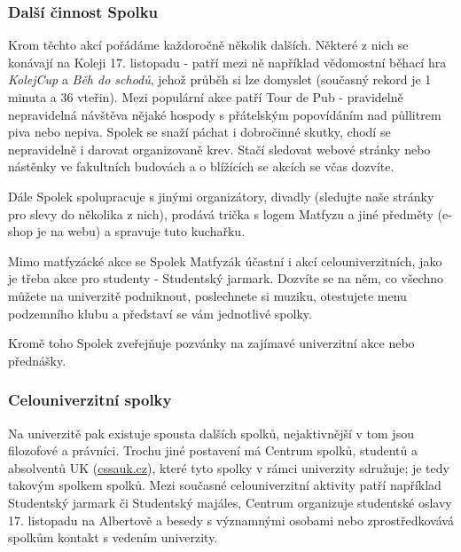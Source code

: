 \subsubsection{Další činnost Spolku}
Krom těchto akcí pořádáme každoročně několik dalších. Některé z nich se konávají
na Koleji 17. listopadu - patří mezi ně například vědomostní běhací hra
\textit{KolejCup} a \textit{Běh do schodů}, jehož průběh si lze domyslet
(současný rekord je 1 minuta a 36 vteřin). Mezi populární akce patří Tour de Pub
- pravidelně nepravidelná návštěva nějaké hospody s přátelským popovídáním nad
půllitrem piva nebo nepiva.
Spolek se snaží páchat i dobročinné skutky, chodí se nepravidelně i darovat organizovaně krev.
Stačí sledovat webové stránky nebo nástěnky ve
fakultních budovách a o blížících se akcích se včas dozvíte.

Dále Spolek spolupracuje s jinými organizátory, divadly (sledujte naše stránky
pro slevy do několika z nich), prodává trička s logem Matfyzu a jiné předměty
(e-shop je na webu) a spravuje tuto kuchařku.

Mimo matfyzácké akce se Spolek Matfyzák účastní i akcí celouniverzitních, jako
je třeba akce pro studenty - Studentský jarmark. Dozvíte se na něm, co všechno
můžete na univerzitě podniknout, poslechnete si muziku, otestujete menu
podzemního klubu a představí se vám jednotlivé spolky.

Kromě toho Spolek zveřejňuje pozvánky na zajímavé univerzitní akce nebo
přednášky.


\subsubsection{Celouniverzitní spolky}
Na univerzitě pak existuje spousta dalších spolků, nejaktivnější v tom jsou
filozofové a právníci. Trochu jiné postavení má Centrum spolků, studentů a
absolventů UK (\url{cssauk.cz}), které tyto spolky v rámci univerzity sdružuje;
je tedy takovým spolkem spolků. Mezi současné celouniverzitní aktivity patří
například Studentský jarmark či Studentský majáles, Centrum organizuje
studentské oslavy 17. listopadu na Albertově a besedy s významnými osobami nebo
zprostředkovává spolkům kontakt s vedením univerzity.